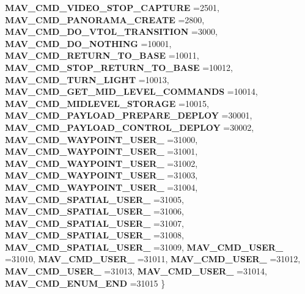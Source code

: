 \begin{DoxyCompactItemize}
\newline
\textbf{ M\+A\+V\+\_\+\+C\+M\+D\+\_\+\+V\+I\+D\+E\+O\+\_\+\+S\+T\+O\+P\+\_\+\+C\+A\+P\+T\+U\+RE} =2501, 
\textbf{ M\+A\+V\+\_\+\+C\+M\+D\+\_\+\+P\+A\+N\+O\+R\+A\+M\+A\+\_\+\+C\+R\+E\+A\+TE} =2800, 
\textbf{ M\+A\+V\+\_\+\+C\+M\+D\+\_\+\+D\+O\+\_\+\+V\+T\+O\+L\+\_\+\+T\+R\+A\+N\+S\+I\+T\+I\+ON} =3000, 
\textbf{ M\+A\+V\+\_\+\+C\+M\+D\+\_\+\+D\+O\+\_\+\+N\+O\+T\+H\+I\+NG} =10001, 
\newline
\textbf{ M\+A\+V\+\_\+\+C\+M\+D\+\_\+\+R\+E\+T\+U\+R\+N\+\_\+\+T\+O\+\_\+\+B\+A\+SE} =10011, 
\textbf{ M\+A\+V\+\_\+\+C\+M\+D\+\_\+\+S\+T\+O\+P\+\_\+\+R\+E\+T\+U\+R\+N\+\_\+\+T\+O\+\_\+\+B\+A\+SE} =10012, 
\textbf{ M\+A\+V\+\_\+\+C\+M\+D\+\_\+\+T\+U\+R\+N\+\_\+\+L\+I\+G\+HT} =10013, 
\textbf{ M\+A\+V\+\_\+\+C\+M\+D\+\_\+\+G\+E\+T\+\_\+\+M\+I\+D\+\_\+\+L\+E\+V\+E\+L\+\_\+\+C\+O\+M\+M\+A\+N\+DS} =10014, 
\newline
\textbf{ M\+A\+V\+\_\+\+C\+M\+D\+\_\+\+M\+I\+D\+L\+E\+V\+E\+L\+\_\+\+S\+T\+O\+R\+A\+GE} =10015, 
\textbf{ M\+A\+V\+\_\+\+C\+M\+D\+\_\+\+P\+A\+Y\+L\+O\+A\+D\+\_\+\+P\+R\+E\+P\+A\+R\+E\+\_\+\+D\+E\+P\+L\+OY} =30001, 
\textbf{ M\+A\+V\+\_\+\+C\+M\+D\+\_\+\+P\+A\+Y\+L\+O\+A\+D\+\_\+\+C\+O\+N\+T\+R\+O\+L\+\_\+\+D\+E\+P\+L\+OY} =30002, 
\textbf{ M\+A\+V\+\_\+\+C\+M\+D\+\_\+\+W\+A\+Y\+P\+O\+I\+N\+T\+\_\+\+U\+S\+E\+R\+\_} =31000, 
\newline
\textbf{ M\+A\+V\+\_\+\+C\+M\+D\+\_\+\+W\+A\+Y\+P\+O\+I\+N\+T\+\_\+\+U\+S\+E\+R\+\_} =31001, 
\textbf{ M\+A\+V\+\_\+\+C\+M\+D\+\_\+\+W\+A\+Y\+P\+O\+I\+N\+T\+\_\+\+U\+S\+E\+R\+\_} =31002, 
\textbf{ M\+A\+V\+\_\+\+C\+M\+D\+\_\+\+W\+A\+Y\+P\+O\+I\+N\+T\+\_\+\+U\+S\+E\+R\+\_} =31003, 
\textbf{ M\+A\+V\+\_\+\+C\+M\+D\+\_\+\+W\+A\+Y\+P\+O\+I\+N\+T\+\_\+\+U\+S\+E\+R\+\_} =31004, 
\newline
\textbf{ M\+A\+V\+\_\+\+C\+M\+D\+\_\+\+S\+P\+A\+T\+I\+A\+L\+\_\+\+U\+S\+E\+R\+\_} =31005, 
\textbf{ M\+A\+V\+\_\+\+C\+M\+D\+\_\+\+S\+P\+A\+T\+I\+A\+L\+\_\+\+U\+S\+E\+R\+\_} =31006, 
\textbf{ M\+A\+V\+\_\+\+C\+M\+D\+\_\+\+S\+P\+A\+T\+I\+A\+L\+\_\+\+U\+S\+E\+R\+\_} =31007, 
\textbf{ M\+A\+V\+\_\+\+C\+M\+D\+\_\+\+S\+P\+A\+T\+I\+A\+L\+\_\+\+U\+S\+E\+R\+\_} =31008, 
\newline
\textbf{ M\+A\+V\+\_\+\+C\+M\+D\+\_\+\+S\+P\+A\+T\+I\+A\+L\+\_\+\+U\+S\+E\+R\+\_} =31009, 
\textbf{ M\+A\+V\+\_\+\+C\+M\+D\+\_\+\+U\+S\+E\+R\+\_} =31010, 
\textbf{ M\+A\+V\+\_\+\+C\+M\+D\+\_\+\+U\+S\+E\+R\+\_} =31011, 
\textbf{ M\+A\+V\+\_\+\+C\+M\+D\+\_\+\+U\+S\+E\+R\+\_} =31012, 
\newline
\textbf{ M\+A\+V\+\_\+\+C\+M\+D\+\_\+\+U\+S\+E\+R\+\_} =31013, 
\textbf{ M\+A\+V\+\_\+\+C\+M\+D\+\_\+\+U\+S\+E\+R\+\_} =31014, 
\textbf{ M\+A\+V\+\_\+\+C\+M\+D\+\_\+\+E\+N\+U\+M\+\_\+\+E\+ND} =31015
 \}
\end{DoxyCompactItemize}


